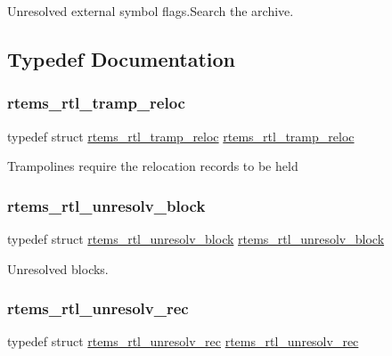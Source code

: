 Unresolved external symbol flags.\+Search the archive. 

\subsection{Typedef Documentation}
\mbox{\label{rtl-unresolved_8h_ac699f8d2434c2ba211349130720e58ab}} 
\subsubsection{\texorpdfstring{rtems\_rtl\_tramp\_reloc}{rtems\_rtl\_tramp\_reloc}}
{\footnotesize\ttfamily typedef struct \mbox{\hyperlink{structrtems__rtl__tramp__reloc}{rtems\+\_\+rtl\+\_\+tramp\+\_\+reloc}}  \mbox{\hyperlink{structrtems__rtl__tramp__reloc}{rtems\+\_\+rtl\+\_\+tramp\+\_\+reloc}}}

Trampolines require the relocation records to be held \mbox{\label{rtl-unresolved_8h_aa4c375b6902a8ed3fa6d236d8bfbe4c5}} 
\subsubsection{\texorpdfstring{rtems\_rtl\_unresolv\_block}{rtems\_rtl\_unresolv\_block}}
{\footnotesize\ttfamily typedef struct \mbox{\hyperlink{structrtems__rtl__unresolv__block}{rtems\+\_\+rtl\+\_\+unresolv\+\_\+block}}  \mbox{\hyperlink{structrtems__rtl__unresolv__block}{rtems\+\_\+rtl\+\_\+unresolv\+\_\+block}}}

Unresolved blocks. \mbox{\label{rtl-unresolved_8h_a676d88ade4fb6f0b743967365ae24310}} 
\subsubsection{\texorpdfstring{rtems\_rtl\_unresolv\_rec}{rtems\_rtl\_unresolv\_rec}}
{\footnotesize\ttfamily typedef struct \mbox{\hyperlink{structrtems__rtl__unresolv__rec}{rtems\+\_\+rtl\+\_\+unresolv\+\_\+rec}}  \mbox{\hyperlink{structrtems__rtl__unresolv__rec}{rtems\+\_\+rtl\+\_\+unresolv\+\_\+rec}}}

